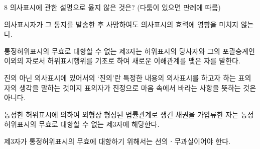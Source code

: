 \begin{question}{8}
의사표시에 관한 설명으로 옳지 않은 것은? (다툼이 있으면 판례에 따름)
\begin{choices}
  \item 의사표시자가 그 통지를 발송한 후 사망하여도 의사표시의 효력에 영향을 미치지 않는다.
  \item 통정허위표시의 무효로 대항할 수 없는 제3자는 허위표시의 당사자와 그의 포괄승계인 이외의 자로서 허위표시행위를 기초로 하여 새로운 이해관계를 맺은 자를 말한다.
  \item 진의 아닌 의사표시에 있어서의 ‘진의’란 특정한 내용의 의사표시를 하고자 하는 표의자의 생각을 말하는 것이지 표의자가 진정으로 마음 속에서 바라는 사항을 뜻하는 것은 아니다.
  \item 통정한 허위표시에 의하여 외형상 형성된 법률관계로 생긴 채권을 가압류한 자는 통정허위표시의 무효로 대항할 수 없는 제3자에 해당한다.
  \item 제3자가 통정허위표시의 무효에 대항하기 위해서는 선의ㆍ무과실이어야 한다.
\end{choices}
\end{question}
